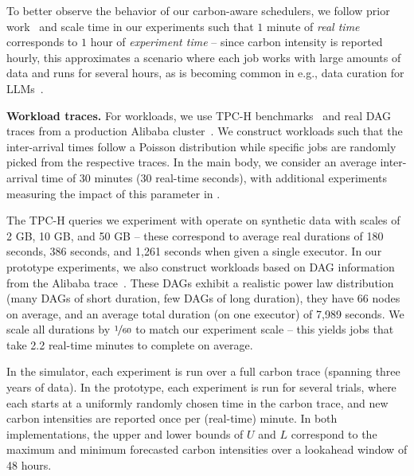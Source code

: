 To better observe the behavior of our carbon-aware schedulers, we follow prior work~\cite{Goiri:2012:GreenHadoop} and scale time in our experiments such that $1$ minute of \textit{real time} corresponds to $1$ hour of \textit{experiment time} -- since carbon intensity is reported hourly, this approximates a scenario where each job works with large amounts of data and runs for several hours, as is becoming common in e.g., data curation for LLMs~\cite{Liu:24, Chen:24, Villalobos:24, Bother:24, Brown:20}.

\vspace{0.05cm}
\noindent
\textbf{Workload traces.}
For workloads, we use TPC-H benchmarks~\cite{TPCH:18} and real DAG traces from a production Alibaba cluster~\cite{Alibaba:18}.  
We construct workloads such that the inter-arrival times follow a Poisson distribution while specific jobs are randomly picked from the respective traces. 
In the main body, we consider an average inter-arrival time of 30 minutes (30 real-time seconds), with additional experiments measuring the impact of this parameter in .

The TPC-H queries we experiment with operate on synthetic data with scales of 2 GB, 10 GB, and 50 GB -- these correspond to average real durations of 180 seconds, 386 seconds, and 1,261 seconds when given a single executor.
In our prototype experiments, we also construct workloads based on DAG information from the Alibaba trace~\cite{Alibaba:18}.  These DAGs exhibit a realistic power law distribution (many DAGs of short duration, few DAGs of long duration), they have 66 nodes on average, and an average total duration (on one executor) of 7,989 seconds. %
We scale all durations by $\nicefrac{1}{60}$ to match our experiment scale -- this yields jobs that take 2.2 real-time minutes to complete on average.  %

In the simulator, each experiment is run over a full carbon trace (spanning three years of data).  In the prototype, each experiment is run for several trials, where each starts at a uniformly randomly chosen time in the carbon trace, and new carbon intensities are reported once per (real-time) minute.  In both implementations, the upper and lower bounds of $U$ and $L$ correspond to the maximum and minimum forecasted carbon intensities over a lookahead window of 48 hours.

